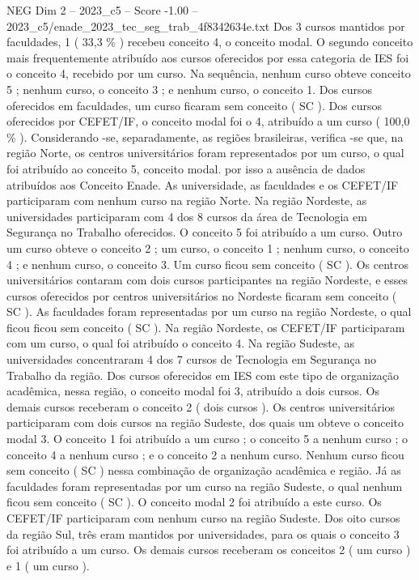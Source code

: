 \begin{textsample}{NEG Dim 2 – 2023\_c5 – Score -1.00 – 2023\_c5/enade\_2023\_tec\_seg\_trab\_4f8342634e.txt}
Dos 3 cursos mantidos por faculdades, 1 ( 33,3 \% ) recebeu conceito 4, o conceito modal.
O segundo conceito mais frequentemente atribuído aos cursos oferecidos por essa categoria de IES foi o conceito 4, recebido por um curso.
Na sequência, nenhum curso obteve conceito 5 ; nenhum curso, o conceito 3 ; e nenhum curso, o conceito 1.
Dos cursos oferecidos em faculdades, um curso ficaram sem conceito ( SC ).
Dos cursos oferecidos por CEFET/IF, o conceito modal foi o 4, atribuído a um curso ( 100,0 \% ).
Considerando -se, separadamente, as regiões brasileiras, verifica -se que, na região Norte, os centros universitários foram representados por um curso, o qual foi atribuído ao conceito 5, conceito modal. por isso a ausência de dados atribuídos aos Conceito Enade.
As universidade, as faculdades e os CEFET/IF participaram com nenhum curso na região Norte.
Na região Nordeste, as universidades participaram com 4 dos 8 cursos da área de Tecnologia em Segurança no Trabalho oferecidos.
O conceito 5 foi atribuído a um curso.
Outro um curso obteve o conceito 2 ; um curso, o conceito 1 ; nenhum curso, o conceito 4 ; e nenhum curso, o conceito 3.
Um curso ficou sem conceito ( SC ).
Os centros universitários contaram com dois cursos participantes na região Nordeste, e esses cursos oferecidos por centros universitários no Nordeste ficaram sem conceito ( SC ).
As faculdades foram representadas por um curso na região Nordeste, o qual ficou ficou sem conceito ( SC ).
Na região Nordeste, os CEFET/IF participaram com um curso, o qual foi atribuído o conceito 4.
Na região Sudeste, as universidades concentraram 4 dos 7 cursos de Tecnologia em Segurança no Trabalho da região.
Dos cursos oferecidos em IES com este tipo de organização acadêmica, nessa região, o conceito modal foi 3, atribuído a dois cursos.
Os demais cursos receberam o conceito 2 ( dois cursos ).
Os centros universitários participaram com dois cursos na região Sudeste, dos quais um obteve o conceito modal 3.
O conceito 1 foi atribuído a um curso ; o conceito 5 a nenhum curso ; o conceito 4 a nenhum curso ; e o conceito 2 a nenhum curso.
Nenhum curso ficou sem conceito ( SC ) nessa combinação de organização acadêmica e região.
Já as faculdades foram representadas por um curso na região Sudeste, o qual nenhum ficou sem conceito ( SC ).
O conceito modal 2 foi atribuído a este curso.
Os CEFET/IF participaram com nenhum curso na região Sudeste.
Dos oito cursos da região Sul, três eram mantidos por universidades, para os quais o conceito 3 foi atribuído a um curso.
Os demais cursos receberam os conceitos 2 ( um curso ) e 1 ( um curso ).

\end{textsample}
